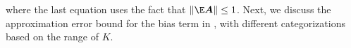 where the last equation uses the fact that $\normnone{\E\mA} \le 1$. Next, we discuss the approximation error bound for the bias term in , with different categorizations based on the range of $K$.
\begin{enumerate}[leftmargin=*]
    

\end{enumerate}
